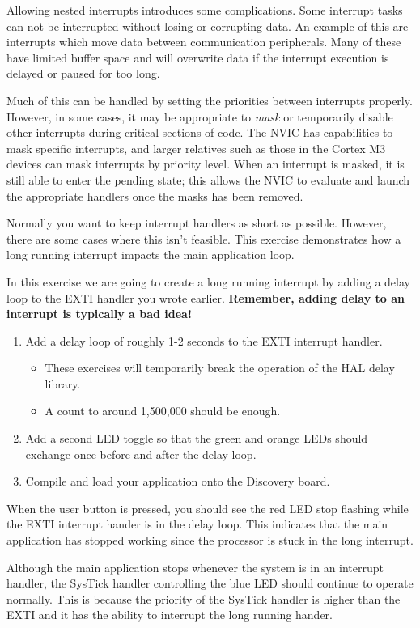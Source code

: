 \documentclass[11pt,fleqn]{book} %
\begin{document}
Allowing nested interrupts introduces some complications. Some interrupt tasks can not be interrupted without losing or corrupting data. An example of this are interrupts which move data between communication peripherals. Many of these have limited buffer space and will overwrite data if the interrupt execution is delayed or paused for too long. 

Much of this can be handled by setting the priorities between interrupts properly. However, in some cases, it may be appropriate to \textit{mask} or temporarily disable other interrupts during critical sections of code. The NVIC has capabilities to mask specific interrupts, and larger relatives such as those in the Cortex M3 devices can mask interrupts by priority level. When an interrupt is masked, it is still able to enter the pending state; this allows the NVIC to evaluate and launch the appropriate handlers once the masks has been removed.

\begin{exercise}
    \label{ex6}
   Normally you want to keep interrupt handlers as short as possible. However, there are some cases where this isn't feasible. This exercise demonstrates how a long running interrupt  impacts the main application loop. 

   In this exercise we are going to create a long running interrupt by adding a delay loop to the EXTI handler you wrote earlier. \textbf{Remember, adding delay to an interrupt is typically a bad idea!} 
   \begin{enumerate}
       \item Add a delay loop of roughly 1-2 seconds to the EXTI interrupt handler.
       \begin{itemize}
           \item These exercises will temporarily break the operation of the HAL delay library.
           \item A count to around 1,500,000 should be enough. 
       \end{itemize} 
       \item Add a second LED toggle so that the green and orange LEDs should exchange once before and after the delay loop. 
       \item Compile and load your application onto the Discovery board.
   \end{enumerate}
   
    \noindent When the user button is pressed, you should see the red LED stop flashing while the EXTI interrupt hander is in the delay loop. This indicates that the main application has stopped working since the processor is stuck in the long interrupt. 
    
   Although the main application stops whenever the system is in an interrupt handler, the SysTick handler controlling the blue LED should continue to operate normally. This is because the priority of the SysTick handler is higher than the EXTI and it has the ability to interrupt the long running hander. 
\end{exercise}
  
\end{document}
